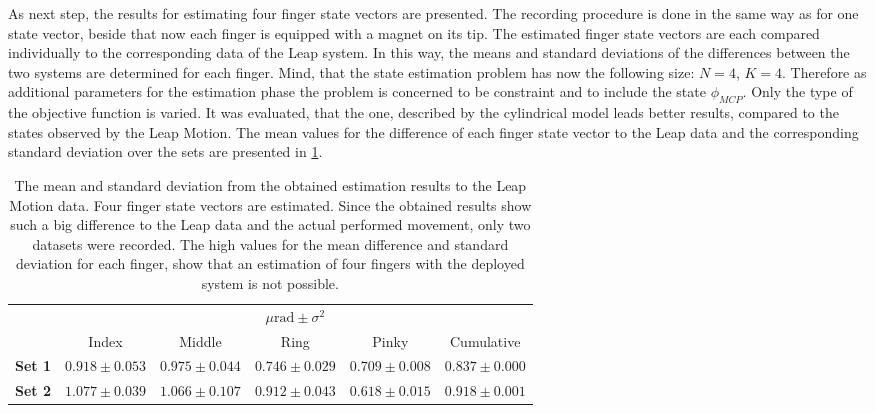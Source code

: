 As next step, the results for estimating four finger state vectors are presented. The recording procedure is done in the same way as for one state vector, beside that now each finger is equipped with a magnet on its tip. The estimated finger state vectors are each compared individually to the corresponding data of the Leap system. In this way, the means and standard deviations of the differences between the two systems are determined for each finger. Mind, that the state estimation problem has now the following size: $ N = 4 $, $ K = 4 $. Therefore as additional parameters for the estimation phase the problem is concerned to be constraint and to include the state $ \phi_{MCP} $. Only the type of the objective function is varied. It was evaluated, that the one, described by the cylindrical model leads better results, compared to the states observed by the Leap Motion. The mean values for the difference of each finger state vector to the Leap data and the corresponding standard deviation over the sets are presented in \ref{tab:estSetFour}. 
\begin{table}[h]
\centering
\begin{tabular}{l c c c c c}
\toprule
&  \multicolumn{5}{c}{$ \mu \si{\radian} \pm \sigma^{2} $} \\ \cmidrule{2-6}
& 			   				 Index 				 & Middle 			   & Ring 				 & Pinky 			   &  Cumulative \\ \midrule
\textbf{Set 1} &  $ 0.918 \pm 0.053 $ & $ 0.975 \pm 0.044 $ & $ 0.746 \pm 0.029 $ & $ 0.709 \pm 0.008 $ & $ 0.837 \pm 0.000 $ \\ 
\textbf{Set 2} &  $ 1.077 \pm 0.039 $ & $ 1.066 \pm 0.107 $ & $ 0.912 \pm 0.043 $ & $ 0.618 \pm 0.015 $ & $ 0.918 \pm 0.001 $ \\ \bottomrule
\end{tabular}
\caption[Difference of estimated states, compared to Leap Motion data for four finger estimation]
{The mean and standard deviation from the obtained estimation results to the Leap Motion data. Four finger state vectors are estimated. Since the obtained results show such a big difference to the Leap data and the actual performed movement, only two datasets were recorded. The high values for the mean difference and standard deviation for each finger, show that an estimation of four fingers with the deployed system is not possible.}
\label{tab:estSetFour}
\end{table}

